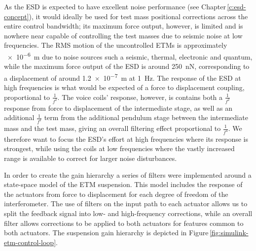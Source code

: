 As the \gls{ESD} is expected to have excellent noise performance (see Chapter\,\ref{c:esd-concept}), it would ideally be used for test mass positional corrections across the entire control bandwidth; its maximum force output, however, is limited and is nowhere near capable of controlling the test masses due to seismic noise at low frequencies. The \gls{RMS} motion of the uncontrolled \glspl{ETM} is approximately \SI{e-6}{\meter} due to noise sources such a seismic, thermal, electronic and quantum, while the maximum force output of the \gls{ESD} is around \SI{250}{\nano\newton}, corresponding to a displacement of around \SI{1.2e-7}{\meter} at \SI{1}{\hertz}. The response of the \gls{ESD} at high frequencies is what would be expected of a force to displacement coupling, proportional to $\frac{1}{f^2}$. The voice coils' response, however, is contains both a $\frac{1}{f^2}$ response from force to displacement of the intermediate stage, as well as an additional $\frac{1}{f^2}$ term from the additional pendulum stage between the intermediate mass and the test mass, giving an overall filtering effect proportional to $\frac{1}{f^4}$. We therefore want to focus the \gls{ESD}'s effort at high frequencies where its response is strongest, while using the coils at low frequencies where the vastly increased range is available to correct for larger noise disturbances.

In order to create the gain hierarchy a series of filters were implemented around a state-space model of the \gls{ETM} suspension. This model includes the response of the actuators from force to displacement for each degree of freedom of the interferometer. The use of filters on the input path to each actuator allows us to split the feedback signal into low- and high-frequency corrections, while an overall filter allows corrections to be applied to both actuators for features common to both actuators. The suspension gain hierarchy is depicted in Figure\,\ref{fig:simulink-etm-control-loop}.

